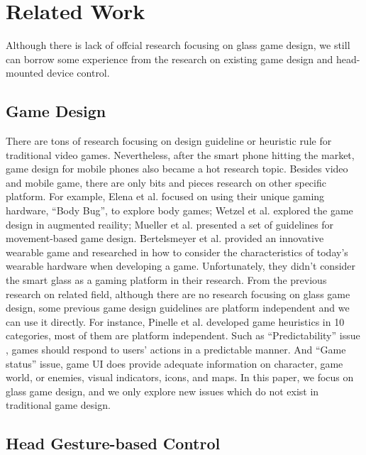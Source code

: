 \section{Related Work}

Although there is lack of offcial research focusing on glass game design, we still can borrow some experience from the research on existing game design and head-mounted device control.


\subsection{Game Design}

There are tons of research focusing on design guideline or heuristic rule for traditional video games\cite{gameflow,criticalreview,chi04game,09game,02game,08game,07game}. Nevertheless, after the smart phone hitting the market, game design for mobile phones also became a hot research topic\cite{mobilegame,mobile06,mobile08,icec06}. Besides video and mobile game, there are only bits and pieces research on other specific platform. For example, Elena et al. focused on using their unique gaming hardware, ``Body Bug'', to explore body games\cite{bodygame}; Wetzel et al. explored the game design in augmented reaility\cite{argame}; Mueller et al. presented a set of guidelines for movement-based game design\cite{movegame}. Bertelsmeyer et al. provided an innovative wearable game and researched in how to consider the characteristics of today's wearable hardware when developing a game\cite{wearable}. Unfortunately, they didn't consider the smart glass as a gaming platform in their research. 
From the previous research on related field, although there are no research focusing on glass game design, some previous game design guidelines are platform independent and we can use it directly. For instance, Pinelle et al.\cite{videogame} developed game heuristics in 10 categories, most of them are platform independent. 
Such as ``Predictability'' issue , games should respond to users' actions in a predictable manner. And ``Game status'' issue, game UI does provide adequate information on character, game world, or enemies, visual indicators, icons, and maps. 
In this paper, we focus on glass game design, and we only explore new issues which do not exist in traditional game design.


\subsection{Head Gesture-based Control}

